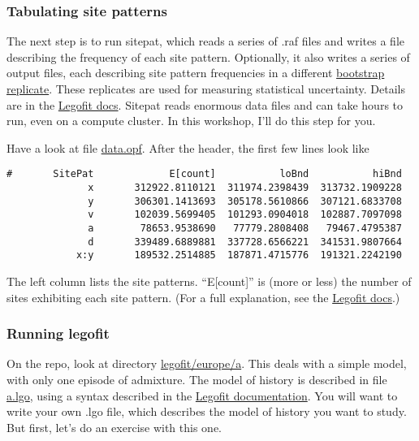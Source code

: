 \documentclass[11pt]{article}
\begin{document}
\subsubsection{Tabulating site patterns}
The next step is to run sitepat, which reads a series of .raf files
and writes a file describing the frequency of each site
pattern. Optionally, it also writes a series of output files, each
describing site pattern frequencies in a different
\href{https://en.wikipedia.org/wiki/Bootstrapping_(statistics)}{bootstrap
  replicate}. These replicates are used for measuring statistical
uncertainty. Details are in the
\href{https://alanrogers.github.io/legofit/html/sitepat.html}{Legofit
  docs}. Sitepat reads enormous data files and can take hours to run,
even on a compute cluster. In this workshop, I'll do this step for
you.

Have a look at file
\href{https://github.com/alanrogers/agar22/blob/main/legofit/europe/data.opf}{data.opf}. After
the header, the first few lines look like
\begin{verbatim}
#       SitePat             E[count]           loBnd           hiBnd
              x       312922.8110121  311974.2398439  313732.1909228
              y       306301.1413693  305178.5610866  307121.6833708
              v       102039.5699405  101293.0904018  102887.7097098
              a        78653.9538690   77779.2808408   79467.4795387
              d       339489.6889881  337728.6566221  341531.9807664
            x:y       189532.2514885  187871.4715776  191321.2242190
\end{verbatim}
The left column lists the site patterns. ``E[count]'' is (more or
less) the number of sites exhibiting each site pattern. (For a full
explanation, see the
\href{https://alanrogers.github.io/legofit/html/index.html#sitepattern}{Legofit
  docs}.)


\subsubsection{Running legofit}
On the repo, look at directory
\href{https://github.com/alanrogers/agar22/tree/main/legofit/europe/a}{legofit/europe/a}. This
deals with a simple model, with only one episode of admixture. The
model of history is described in file
\href{https://github.com/alanrogers/agar22/tree/main/legofit/europe/a/a.lgo}{a.lgo},
using a syntax described in the
\href{https://alanrogers.github.io/legofit/html/index.html#lgo}{Legofit
  documentation}. You will want to write your own .lgo file, which
describes the model of history you want to study. But first, let's
do an exercise with this one.
\end{document}
